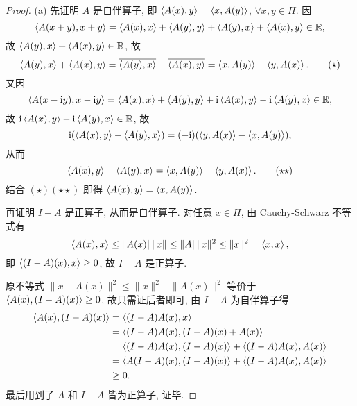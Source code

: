 \begin{proof}
    (a) 先证明 $A$ 是自伴算子, 即 $\left\langle A(x),y\right\rangle=\left\langle x,A(y)\right\rangle$, $\forall x,y\in H$. 因
    \[\left\langle A(x+y),x+y\right\rangle=\left\langle A(x),x\right\rangle+\left\langle A(y),y\right\rangle+\left\langle A(y),x\right\rangle+\left\langle A(x),y\right\rangle\in\mathbb{R},\]
    故 $\left\langle A(y),x\right\rangle+\left\langle A(x),y\right\rangle\in\mathbb{R}$, 故
    \begin{equation}
            \left\langle A(y),x\right\rangle+\left\langle A(x),y\right\rangle=\overline{\left\langle A(y),x\right\rangle}+\overline{\left\langle A(x),y\right\rangle}=\left\langle x,A(y)\right\rangle+\left\langle y,A(x)\right\rangle.\tag{$\star$}
    \end{equation}
    又因
    \[\left\langle A(x-\mathrm{i} y),x-\mathrm{i} y\right\rangle=\left\langle A(x),x\right\rangle+\left\langle A(y),y\right\rangle+\mathrm{i}\left\langle A(x),y\right\rangle-\mathrm{i}\left\langle A(y),x\right\rangle\in\mathbb{R},\]
    故 $\mathrm{i}\left\langle A(x),y\right\rangle-\mathrm{i}\left\langle A(y),x\right\rangle\in\mathbb{R}$, 故
    \[\mathrm{i}(\left\langle A(x),y\right\rangle-\left\langle A(y),x\right\rangle)=(-\mathrm{i})(\left\langle y,A(x)\right\rangle-\left\langle x,A(y)\right\rangle),\]
    从而
    \begin{equation}
        \left\langle A(x),y\right\rangle-\left\langle A(y),x\right\rangle=\left\langle x,A(y)\right\rangle-\left\langle y,A(x)\right\rangle.\tag{$\star\star$}
    \end{equation}
    结合 $(\star)(\star\star)$ 即得 $\left\langle A(x),y\right\rangle=\left\langle x,A(y)\right\rangle$.

    再证明 $I-A$ 是正算子, 从而是自伴算子. 对任意 $x\in H$, 由 Cauchy-Schwarz 不等式有
    \[\left\langle A(x),x\right\rangle\leq\|A(x)\|\|x\|\leq\|A\|\|x\|^2\leq\|x\|^2=\left\langle x,x\right\rangle,\]
    即 $\left\langle(I-A)(x),x\right\rangle\geq 0$, 故 $I-A$ 是正算子.

    原不等式 $\|x-A(x)\|^2\leq\|x\|^2-\|A(x)\|^2$ 等价于 $\left\langle A(x),(I-A)(x)\right\rangle\geq 0$,
    故只需证后者即可, 由 $I-A$ 为自伴算子得
    \begin{align*}
        \left\langle A(x),(I-A)(x)\right\rangle
        & =\left\langle(I-A)A(x),x\right\rangle \\
        & =\left\langle(I-A)A(x),(I-A)(x)+A(x)\right\rangle \\
        & =\left\langle(I-A)A(x),(I-A)(x)\right\rangle+\left\langle(I-A)A(x),A(x)\right\rangle \\
        & =\left\langle A(I-A)(x),(I-A)(x)\right\rangle+\left\langle(I-A)A(x),A(x)\right\rangle \\
        & \geq 0.
    \end{align*}
    最后用到了 $A$ 和 $I-A$ 皆为正算子, 证毕.
\end{proof}

